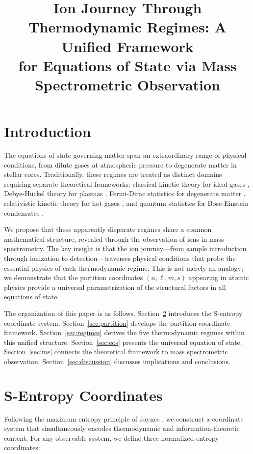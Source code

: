 \title{Ion Journey Through Thermodynamic Regimes: A Unified Framework\\
for Equations of State via Mass Spectrometric Observation}

\section{Introduction}

The equations of state governing matter span an extraordinary range of physical conditions, from dilute gases at atmospheric pressure to degenerate matter in stellar cores. Traditionally, these regimes are treated as distinct domains requiring separate theoretical frameworks: classical kinetic theory for ideal gases \cite{boltzmann1964lectures}, Debye-H\"{u}ckel theory for plasmas \cite{debye1923theory}, Fermi-Dirac statistics for degenerate matter \cite{fermi1926quantisierung}, relativistic kinetic theory for hot gases \cite{juttner1911maxwell}, and quantum statistics for Bose-Einstein condensates \cite{einstein1924quantentheorie, bose1924plancks}.

We propose that these apparently disparate regimes share a common mathematical structure, revealed through the observation of ions in mass spectrometry. The key insight is that the ion journey---from sample introduction through ionization to detection---traverses physical conditions that probe the essential physics of each thermodynamic regime. This is not merely an analogy; we demonstrate that the partition coordinates $(n, \ell, m, s)$ appearing in atomic physics provide a universal parametrization of the structural factors in all equations of state.

The organization of this paper is as follows. Section~\ref{sec:s-entropy} introduces the S-entropy coordinate system. Section~\ref{sec:partition} develops the partition coordinate framework. Section~\ref{sec:regimes} derives the five thermodynamic regimes within this unified structure. Section~\ref{sec:eos} presents the universal equation of state. Section~\ref{sec:ms} connects the theoretical framework to mass spectrometric observation. Section~\ref{sec:discussion} discusses implications and conclusions.

\section{S-Entropy Coordinates}
\label{sec:s-entropy}

Following the maximum entropy principle of Jaynes \cite{jaynes1957information}, we construct a coordinate system that simultaneously encodes thermodynamic and information-theoretic content. For any observable system, we define three normalized entropy coordinates:

